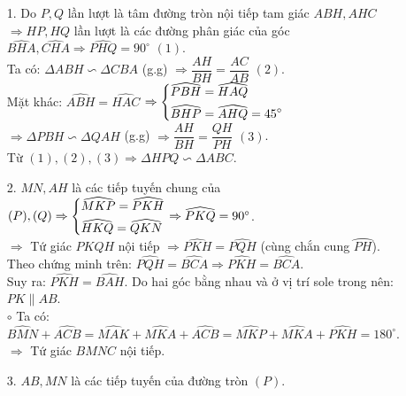 \begin{ex}
{\begin{center}
   \end{center}
   \begin{enumerate}
   \item[1.] Do $P,Q$ lần lượt là tâm đường tròn nội tiếp tam giác $ABH,AHC$\\
   $\Rightarrow HP,HQ$ lần lượt là các đường phân giác của góc $\widehat{BHA}, \widehat{CHA}\Rightarrow \widehat{PHQ}=90^\circ$ $(1)$.\\
   Ta có: $\Delta ABH\backsim\Delta CBA$ (g.g) $\Rightarrow \dfrac{AH}{BH}=\dfrac{AC}{AB}$ $(2)$.\\
   Mặt khác: $\widehat{ABH}=\widehat{HAC}$
  $\Rightarrow \left\{\begin{aligned}&\widehat{PBH}=\widehat{HAQ}\\&\widehat{BHP}=\widehat{AHQ}=45^\circ\end{aligned}\right.$\\
  $\Rightarrow \Delta PBH\backsim\Delta QAH$ (g.g) $\Rightarrow \dfrac{AH}{BH}=\dfrac{QH}{PH}$ $(3)$.\\
  Từ $(1),(2),(3) \Rightarrow \Delta HPQ\backsim\Delta ABC$.
  \item[2.] $MN, AH$ là các tiếp tuyến chung của $(P), (Q)\Rightarrow \left\{\begin{aligned}&\widehat{MKP}=\widehat{PKH}\\&\widehat{HKQ}=\widehat{QKN}\end{aligned}\right.\Rightarrow \widehat{PKQ}=90^\circ$.\\
  $\Rightarrow $ Tứ giác $PKQH$ nội tiếp $\Rightarrow \widehat{PKH}=\widehat{PQH}$ (cùng chắn cung $\wideparen{PH}$).\\
  Theo chứng minh trên: $\widehat{PQH}=\widehat{BCA}\Rightarrow \widehat{PKH}=\widehat{BCA}$.\\
  Suy ra: $\widehat{PKH}=\widehat{BAH}$.
  Do hai góc bằng nhau và ở vị trí sole trong nên: $PK\parallel AB$.\\
  $\circ$ Ta có: $\widehat{BMN}+\widehat{ACB}=\widehat{MAK}+\widehat{MKA}+\widehat{ACB}=\widehat{MKP}+\widehat{MKA}+\widehat{PKH}=180^\circ$.\\
  $\Rightarrow $ Tứ giác $BMNC$ nội tiếp.
  \item[3.] $AB,MN$ là các tiếp tuyến của đường tròn $(P)$.\\

\end{enumerate}}
\end{ex}
